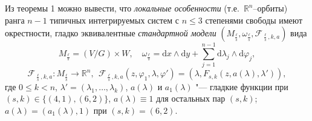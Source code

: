 Из теоремы 1 можно вывести, что {\em локальные особенности} (т.е.\ $\mathbb{R}^n$--орбиты) ранга $n-1$ типичных интегрируемых систем с $n\le3$ степенями свободы имеют окрестности, гладко эквивалентные {\em  стандартной модели} $(M_{\frac\ell s},\omega_{\frac\ell s},\mathcal{F}_{\frac\ell s,k,a})$ вида
$$
M_{\frac\ell s}=(V/G)\times W, \quad
\omega_{\frac\ell s} = \mathrm dx\wedge\mathrm dy + \sum_{j=1}^{n-1}\mathrm d\lambda_j\wedge\mathrm  d\varphi_j,
$$
$$
\mathcal{F}_{\frac\ell s,k,a}:M_{\frac\ell s}
\to \mathbb R^n,\ \ \mathcal{F}_{\frac\ell s,k,a}(z,\varphi_1,\lambda,\varphi')=(\lambda,{F_{s,k}}(z,a(\lambda),\lambda')),
$$
где $0\le k<n$, $\lambda'=(\lambda_1,\dots,\lambda_k)$,
$a(\lambda)$ и $a_1(\lambda)$ "--- гладкие функции при $(s,k)\in\{(4,1),(6,2)\}$,
$a(\lambda)\equiv1$ для остальных пар $(s,k)$;
$a(\lambda)=(a_1(\lambda),1)$ при $(s,k)=(6,2)$.





%

